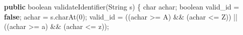 \documentclass[
  letterpaper,
  DIV=11,
  numbers=noendperiod]{scrartcl}
\newenvironment{Shaded}{\begin{snugshade}}{\end{snugshade}}
\newcommand{\BuiltInTok}[1]{\textcolor[rgb]{0.00,0.23,0.31}{#1}}
\newcommand{\CharTok}[1]{\textcolor[rgb]{0.13,0.47,0.30}{#1}}
\newcommand{\DataTypeTok}[1]{\textcolor[rgb]{0.68,0.00,0.00}{#1}}
\newcommand{\DecValTok}[1]{\textcolor[rgb]{0.68,0.00,0.00}{#1}}
\newcommand{\FunctionTok}[1]{\textcolor[rgb]{0.28,0.35,0.67}{#1}}
\newcommand{\KeywordTok}[1]{\textcolor[rgb]{0.00,0.23,0.31}{\textbf{#1}}}
\newcommand{\NormalTok}[1]{\textcolor[rgb]{0.00,0.23,0.31}{#1}}
\newcommand{\OperatorTok}[1]{\textcolor[rgb]{0.37,0.37,0.37}{#1}}
\begin{document}
\begin{Shaded}
\begin{Highlighting}[]
\KeywordTok{public} \DataTypeTok{boolean} \FunctionTok{validateIdentifier}\OperatorTok{(}\BuiltInTok{String}\NormalTok{ s}\OperatorTok{)} \OperatorTok{\{}
  \DataTypeTok{char}\NormalTok{ achar}\OperatorTok{;}
  \DataTypeTok{boolean}\NormalTok{ valid\_id }\OperatorTok{=} \KeywordTok{false}\OperatorTok{;}
\NormalTok{  achar }\OperatorTok{=}\NormalTok{ s}\OperatorTok{.}\FunctionTok{charAt}\OperatorTok{(}\DecValTok{0}\OperatorTok{);}
\NormalTok{  valid\_id }\OperatorTok{=} \OperatorTok{((}\NormalTok{achar }\OperatorTok{\textgreater{}=} \CharTok{\textquotesingle{}A\textquotesingle{}}\OperatorTok{)} \OperatorTok{\&\&} \OperatorTok{(}\NormalTok{achar }\OperatorTok{\textless{}=} \CharTok{\textquotesingle{}Z\textquotesingle{}}\OperatorTok{))} \OperatorTok{||} \OperatorTok{((}\NormalTok{achar }\OperatorTok{\textgreater{}=} \CharTok{\textquotesingle{}a\textquotesingle{}}\OperatorTok{)} \OperatorTok{\&\&} \OperatorTok{(}\NormalTok{achar }\OperatorTok{\textless{}=} \CharTok{\textquotesingle{}z\textquotesingle{}}\OperatorTok{));}


\end{Highlighting}
\end{Shaded}
\end{document}
